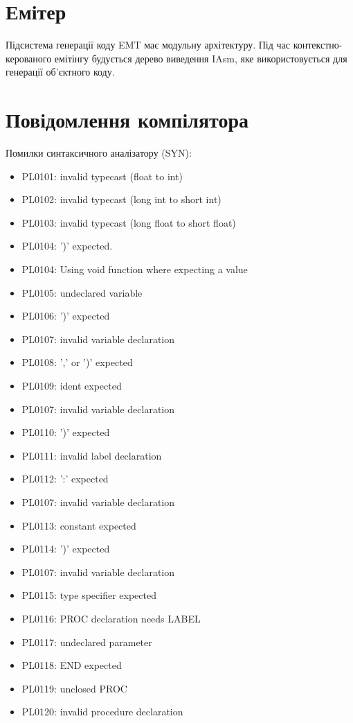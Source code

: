 \documentclass{memoir}
\begin{document}
\section{Емітер}
Підсистема генерації коду EMT має модульну архітектуру. Під час контекстно-керованого емітінгу будується дерево виведення IAsm, яке використовується для генерації об’єктного коду.

\section{Повідомлення компілятора}

Помилки синтаксичного аналізатору (SYN):

\begin{itemize}
\item PL0101: invalid typecast (float to int)
\item PL0102: invalid typecast (long int to short int)
\item PL0103: invalid typecast (long float to short float)
\item PL0104: ')' expected.
\item PL0104: Using void function where expecting a value
\item PL0105: undeclared variable
\item PL0106: ')' expected
\item PL0107: invalid variable declaration
\item PL0108: ',' or ')' expected
\item PL0109: ident expected
\item PL0107: invalid variable declaration
\item PL0110: ')' expected
\item PL0111: invalid label declaration
\item PL0112: ':' expected
\item PL0107: invalid variable declaration
\item PL0113: constant expected
\item PL0114: ')' expected
\item PL0107: invalid variable declaration
\item PL0115: type specifier expected
\item PL0116: PROC declaration needs LABEL
\item PL0117: undeclared parameter
\item PL0118: END expected
\item PL0119: unclosed PROC
\item PL0120: invalid procedure declaration

\end{itemize}
\end{document}
